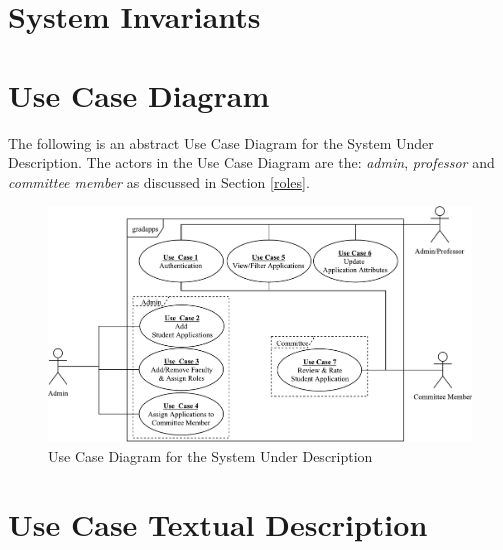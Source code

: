 \documentclass[fontsize=12pt,paper=letter,twoside]{scrartcl}
\begin{document}
\newpage
\section{System Invariants}	\label{sec:invs}

\label{INV1}
\label{INV2}
\label{INV3}
\label{INV4}
\label{INV5}

\newpage
\section{Use Case Diagram} \label{sec:ucd}

The following is an abstract Use Case Diagram for the System Under Description. The actors in the Use Case Diagram are the: \emph{admin}, \emph{professor} and \emph{committee member} as discussed in Section \ref{roles}.

\begin{figure}[!htb]
\begin{center}
\includegraphics[width=.99\textwidth]{images/gradapps-usecase.pdf}
\end{center}
\caption{Use Case Diagram for the System Under Description}
\label{fig:ucd}
\end{figure}

\newpage
\section{Use Case Textual Description} \label{sec:uctd}
\end{document}
